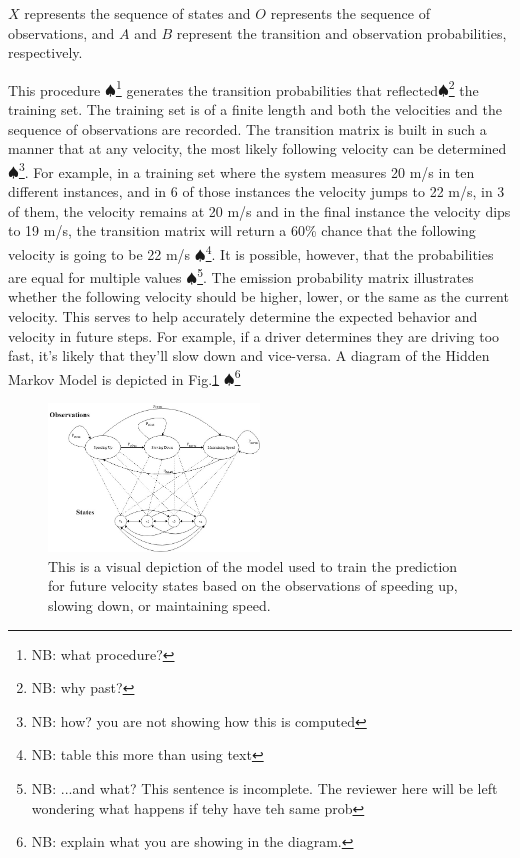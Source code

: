 \documentclass[conference]{IEEEtran}
\newcommand\NB[1]{$\spadesuit$\footnote{NB: #1}}
\begin{document}
$X$ represents the sequence of states and $O$ represents the sequence of observations, and $A$ and $B$ represent the transition and observation probabilities, respectively. 

This procedure \NB{what procedure?} generates the transition probabilities that reflected\NB{why past?} the training set. The training set is of a finite length and both the velocities and the sequence of observations are recorded. The transition matrix is built in such a manner that at any velocity, the most likely following velocity can be determined \NB{how? you are not showing how this is computed}. For example, in a training set where the system measures 20 m/s in ten different instances, and in 6 of those instances the velocity jumps to 22 m/s, in 3 of them, the velocity remains at 20 m/s and in the final instance the velocity dips to 19 m/s, the transition matrix will return a 60\% chance that the following velocity is going to be 22 m/s \NB{table this more than using text}. It is possible, however, that the probabilities are equal for multiple values \NB{...and what? This sentence is incomplete. The reviewer here will be left wondering what happens if tehy have teh same prob}. The emission probability matrix illustrates whether the following velocity should be higher, lower, or the same as the current velocity. This serves to help accurately determine the expected behavior and velocity in future steps. For example, if a driver determines they are driving too fast, it's likely that they'll slow down and vice-versa. A diagram of the Hidden Markov Model is depicted in Fig.\ref{fig:hmmdiag} \NB{explain what you are showing in the diagram.}

\begin{figure}[ht]
    \includegraphics[width=0.5\textwidth]{hmmdiag.jpg}
    \caption{This is a visual depiction of the model used to train the prediction for future velocity states based on the observations of speeding up, slowing down, or maintaining speed.}
    \label{fig:hmmdiag}
\end{figure}
\end{document}
